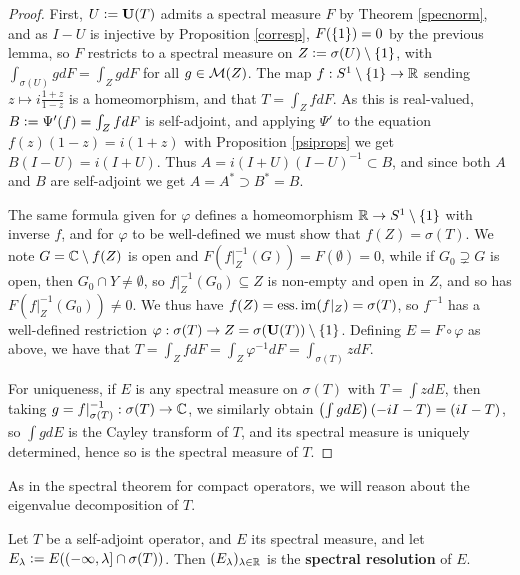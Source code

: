 \documentclass[10pt]{amsart}
\begin{document}
\begin{proof}
    First, $U \vcentcolon= \mathbf{U}(T)$ admits a spectral measure $F$ by Theorem \ref{specnorm}, and as $I - U$ is injective by Proposition \ref{corresp}, $F(\left\{  1  \right\}) = 0$ by the previous lemma, so $F$ restricts to a spectral measure on $Z \vcentcolon= \sigma(U) \setminus \left\{  1  \right\}$, with $\int_{\sigma(U)} g dF = \int_Z g dF$ for all $g \in \mathcal{M}(Z)$. The map $f : S^1 \setminus \left\{  1  \right\} \to \mathbb{R}$ sending $z \mapsto i\frac{1 + z}{1 - z}$ is a homeomorphism, and that $T = \int_Z f dF$. As this is real-valued, $B \vcentcolon= \Psi'(f) = \int_Z f dF$ is self-adjoint, and applying $\Psi'$ to the equation $f(z)(1 - z) = i(1 + z)$ with Proposition \ref{psiprops} we get $B(I - U) = i(I + U)$. Thus $A = i(I + U)(I - U)^{-1} \subset B$, and since both $A$ and $B$ are self-adjoint we get $A = A^* \supset B^* = B$.

    The same formula given for $\varphi$ defines a homeomorphism $\mathbb{R} \to S^1 \setminus \left\{  1  \right\}$ with inverse $f$, and for $\varphi$ to be well-defined we must show that $f(Z) = \sigma(T)$. We note $G = \mathbb{C} \setminus f(Z)$ is open and $F(f|_Z^{-1}(G)) = F(\emptyset) = 0$, while if $G_0 \supsetneq G$ is open, then $G_0 \cap Y \neq \emptyset$, so $f|_Z^{-1}(G_0) \subseteq Z$ is non-empty and open in $Z$, and so has $F(f|_Z^{-1}(G_0)) \neq 0$. We thus have $f(Z) = \operatorname{ess.im}(f|_Z) = \sigma(T)$, so $f^{-1}$ has a well-defined restriction $\varphi : \sigma(T) \to Z = \sigma(\mathbf{U}(T)) \setminus \left\{  1  \right\}$. Defining $E = F \circ \varphi$ as above, we have that $T = \int_Z f dF = \int_Z \varphi^{-1} dF = \int_{\sigma(T)} z dF$.

    For uniqueness, if $E$ is any spectral measure on $\sigma(T)$ with $T = \int z dE$, then taking $g = f|_{\sigma(T)}^{-1} : \sigma(T) \to \mathbb{C}$, we similarly obtain $\left(  \int g dE  \right)(-iI - T) = (iI - T)$, so $\int g dE$ is the Cayley transform of $T$, and its spectral measure is uniquely determined, hence so is the spectral measure of $T$.
\end{proof}
As in the spectral theorem for compact operators, we will reason about the eigenvalue decomposition of $T$. 
\begin{definition}
    Let $T$ be a self-adjoint operator, and $E$ its spectral measure, and let $E_\lambda \vcentcolon= E((-\infty, \lambda] \cap \sigma(T))$. Then $(E_\lambda)_{\lambda \in \mathbb{R}}$ is the \textbf{spectral resolution} of $E$.
\end{definition}
\end{document}
